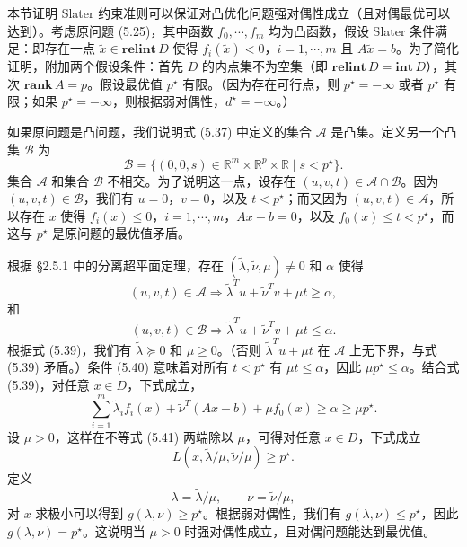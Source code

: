 \documentclass[UTF8, 12pt, fontset=fandol, oneside]{ctexart}
\begin{document}
本节证明 Slater 约束准则可以保证对凸优化问题强对偶性成立（且对偶最优可以达到）。考虑原问题 (5.25)，其中函数 $f_0,\cdots,f_m$ 均为凸函数，假设 Slater 条件满足：即存在一点 $\tilde{x}\in\mathbf{relint}\,D$ 使得 $f_i(\tilde{x})<0$，$i=1,\cdots,m$ 且 $A\tilde{x}=b$。为了简化证明，附加两个假设条件：首先 $D$ 的内点集不为空集（即 $\mathbf{relint}\,D=\mathbf{int}\,D$），其次 $\mathbf{rank}\,A=p$。假设最优值 $p^\star$ 有限。（因为存在可行点，则 $p^\star=-\infty$ 或者 $p^\star$ 有限；如果 $p^\star=-\infty$，则根据弱对偶性，$d^\star=-\infty$。）

如果原问题是凸问题，我们说明式 (5.37) 中定义的集合 $\mathcal{A}$ 是凸集。定义另一个凸集 $\mathcal{B}$ 为
\[
\mathcal{B}=\{(0,0,s)\in\mathbb{R}^m\times\mathbb{R}^p\times\mathbb{R}\mid s<p^\star\}.
\]
集合 $\mathcal{A}$ 和集合 $\mathcal{B}$ 不相交。为了说明这一点，设存在 $(u,v,t)\in\mathcal{A}\cap\mathcal{B}$。因为 $(u,v,t)\in\mathcal{B}$，我们有 $u=0$，$v=0$，以及 $t<p^\star$；而又因为 $(u,v,t)\in\mathcal{A}$，所以存在 $x$ 使得 $f_i(x)\leq 0$，$i=1,\cdots,m$，$Ax-b=0$，以及 $f_0(x)\leq t<p^\star$，而这与 $p^\star$ 是原问题的最优值矛盾。

根据 §2.5.1 中的分离超平面定理，存在 $(\tilde{\lambda},\tilde{\nu},\mu)\neq 0$ 和 $\alpha$ 使得
\begin{equation}
(u,v,t)\in\mathcal{A}\Longrightarrow \tilde{\lambda}^Tu+\tilde{\nu}^Tv+\mu t\geq \alpha,
\tag{5.39}
\end{equation}
和
\begin{equation}
(u,v,t)\in\mathcal{B}\Longrightarrow \tilde{\lambda}^Tu+\tilde{\nu}^Tv+\mu t\leq \alpha.
\tag{5.40}
\end{equation}
根据式 (5.39)，我们有 $\tilde{\lambda}\succeq 0$ 和 $\mu\geq 0$。（否则 $\tilde{\lambda}^Tu+\mu t$ 在 $\mathcal{A}$ 上无下界，与式 (5.39) 矛盾。）条件 (5.40) 意味着对所有 $t<p^\star$ 有 $\mu t\leq \alpha$，因此 $\mu p^\star\leq \alpha$。结合式 (5.39)，对任意 $x\in D$，下式成立，
\begin{equation}
\sum_{i=1}^m \tilde{\lambda}_i f_i(x)+\tilde{\nu}^T(Ax-b)+\mu f_0(x)\geq \alpha\geq \mu p^\star.
\tag{5.41}
\end{equation}
设 $\mu>0$，这样在不等式 (5.41) 两端除以 $\mu$，可得对任意 $x\in D$，下式成立
\[
L(x,\tilde{\lambda}/\mu,\tilde{\nu}/\mu)\geq p^\star.
\]
定义
\[
\lambda=\tilde{\lambda}/\mu,\qquad \nu=\tilde{\nu}/\mu,
\]
对 $x$ 求极小可以得到 $g(\lambda,\nu)\geq p^\star$。根据弱对偶性，我们有 $g(\lambda,\nu)\leq p^\star$，因此 $g(\lambda,\nu)=p^\star$。这说明当 $\mu>0$ 时强对偶性成立，且对偶问题能达到最优值。
\end{document}
